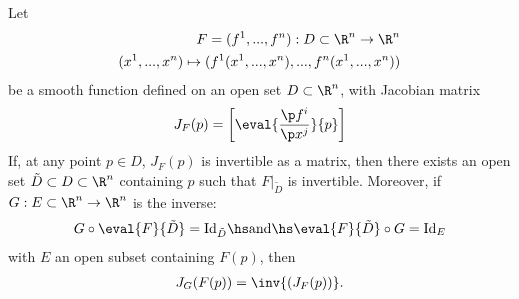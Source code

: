 \documentclass{article}
\begin{document}
\begin{theorem}
    Let 
    \begin{align*}
        F = (f^1,...,f^n):D\subset \R^n\to\R^n\\
        (x^1,...,x^n)\mapsto (f^1(x^1,...,x^n), ..., f^n(x^1,...,x^n))
    \end{align*} 
    be a smooth function defined on an open set $D\subset\R^n$, with Jacobian matrix 
    \begin{align*}
        J_F(p)=\left[\eval{\frac{\p f^i}{\p x^j}}{p}\right]
    \end{align*}
    If, at any point $p\in D$, $J_F(p)$ is invertible as a matrix, then there exists 
    an open set $\tilde D\subset D\subset \R^n$ containing $p$ such that $F|_{\tilde D}$
    is invertible.
    Moreover, if $G:E\subset\R^n\to \R^n$ is the inverse:
    \begin{align*}
        G\circ \eval{F}{\tilde D}=\text{Id}_{\tilde D} \hs\text{and}\hs \eval{F}{\tilde D}\circ G=\text{Id}_E
    \end{align*}
    with $E$ an open subset containing $F(p)$, then
    \begin{align*}
        J_G(F(p))=\inv{(J_F(p))}.
    \end{align*}
\end{theorem}
\end{document}

